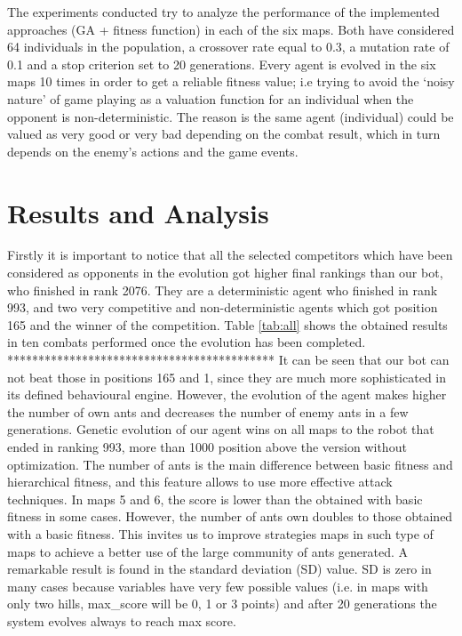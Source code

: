 \documentclass[runningheads]{llncs}
\begin{document}
The experiments conducted try to analyze the performance of the implemented approaches (GA + fitness function) in each of the six maps. Both have considered 64 individuals in the population, a crossover rate equal to 0.3, a mutation rate of 0.1 and a stop criterion set to 20 generations. Every agent is evolved in the six maps 10 times in order to get a reliable fitness value; i.e trying to avoid the `noisy nature' \cite{Mora_noisy_jcst} of game playing as a valuation function for an individual when the opponent is non-deterministic. The reason is the same agent (individual) could be valued as very good or very bad depending on the combat result, which in turn depends on the enemy's actions and the game events.


\section{Results and Analysis}
\label{sec:results}


Firstly it is important to notice that all the selected competitors which have been considered as opponents in the evolution got higher final rankings than our bot, who finished in rank 2076. They are a deterministic agent who finished in rank 993, and two very competitive and non-deterministic agents which got position 165 and the winner of the competition.
Table \ref{tab:all} shows the obtained results in ten combats performed once the evolution has been completed.
*******************************************
It can be seen that our bot can not beat those in positions 165 and 1, since they are much more sophisticated in its defined behavioural engine. However, the evolution of the agent makes higher the number of own ants and decreases the number of enemy ants in a few generations. Genetic evolution of our agent wins on all maps to the robot that ended in ranking 993, more than 1000 position above the version without optimization. The number of ants is the main difference between basic fitness and hierarchical fitness, and this feature allows to use more effective attack techniques. In maps 5 and 6, the score is lower than the obtained with basic fitness in some cases. However, the number of ants own doubles to those obtained with a basic fitness. This invites us to improve strategies maps in such type of maps to achieve a better use of the large community of ants generated. A remarkable result is found in the standard deviation (SD) value. SD is zero in many cases because variables have very few possible values (i.e. in maps with only two hills, max\_score will be 0, 1 or 3 points) and after 20 generations the system evolves always to reach max score. 
%
%
%
%
\end{document}

